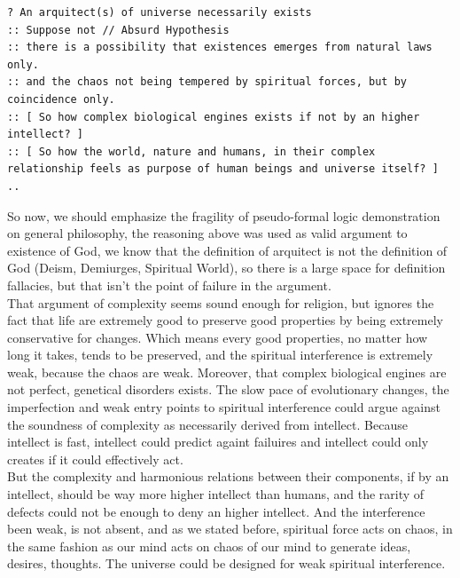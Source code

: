 \documentclass[12pt,a4paper]{article}
\begin{document}
\begin{lstlisting}
? An arquitect(s) of universe necessarily exists 
:: Suppose not // Absurd Hypothesis
:: there is a possibility that existences emerges from natural laws only.
:: and the chaos not being tempered by spiritual forces, but by coincidence only.
:: [ So how complex biological engines exists if not by an higher intellect? ]
:: [ So how the world, nature and humans, in their complex relationship feels as purpose of human beings and universe itself? ]
.. 
\end{lstlisting}

\hspace{\baselineskip}

So now, we should emphasize the fragility of pseudo-formal logic demonstration on general philosophy, the reasoning above was used as valid argument to existence of God, we know that the definition of arquitect is not the definition of God (Deism, Demiurges, Spiritual World), so there is a large space for definition fallacies, but that isn't the point of failure in the argument. \\

That argument of complexity seems sound enough for religion, but ignores the fact that life are extremely good to preserve good properties by being extremely conservative for changes. Which means every good properties, no matter how long it takes, tends to be preserved, and the spiritual interference is extremely weak, because the chaos are weak. Moreover, that complex biological engines are not perfect, genetical disorders exists. The slow pace of evolutionary changes, the imperfection and weak entry points to spiritual interference could argue against the soundness of complexity as necessarily derived from intellect. Because intellect is fast, intellect could predict againt failuires and intellect could only creates if it could effectively act.\\

But the complexity and harmonious relations between their components, if by an intellect, should be way more higher intellect than humans, and the rarity of defects could not be enough to deny an higher intellect. And the interference been weak, is not absent, and as we stated before, spiritual force acts on chaos, in the same fashion as our mind acts on chaos of our mind to generate ideas, desires, thoughts. The universe could be designed for weak spiritual interference. \\
\end{document}
